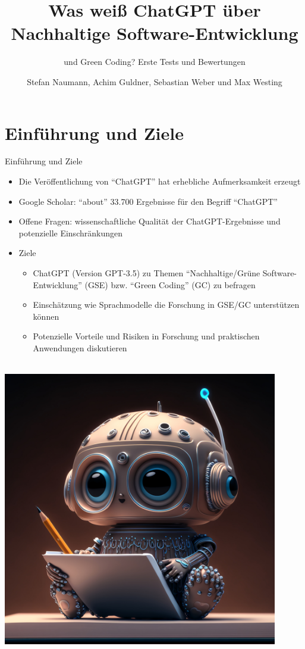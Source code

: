 \documentclass[10pt,aspectratio=169]{beamer}
\title{\Large Was weiß ChatGPT über Nachhaltige Software-Entwicklung}
\subtitle{\Large und Green Coding? Erste Tests und Bewertungen}
\author{\large Stefan Naumann, Achim Guldner, Sebastian Weber und Max Westing}
\institute{\\Hochschule Trier\\Umwelt-Campus Birkenfeld\\Institut für Softwaresysteme}
\begin{document}
\titlepage



\section{Einführung und Ziele}
\begin{frame}{Einführung und Ziele}
    \begin{minipage}{0.65\linewidth}
    \begin{itemize}
        \item Die Veröffentlichung von ``ChatGPT'' hat erhebliche Aufmerksamkeit erzeugt
        \item Google Scholar: ``about'' 33.700 Ergebnisse für den Begriff ``ChatGPT''
        \item Offene Fragen: wissenschaftliche Qualität der ChatGPT-Ergebnisse und potenzielle Einschränkungen
        \item Ziele
        \begin{itemize}
            \item ChatGPT (Version GPT-3.5) zu Themen ``Nachhaltige/Grüne Software-Entwicklung'' (GSE) bzw. ``Green Coding'' (GC) zu befragen
            \item Einschätzung wie Sprachmodelle die Forschung in GSE/GC unterstützen können
            \item Potenzielle Vorteile und Risiken in Forschung und praktischen Anwendungen diskutieren
        \end{itemize}
    \end{itemize}
    \end{minipage}
    \begin{minipage}{0.34\linewidth}
        ~~~~~~~~\includegraphics[width=0.9\textwidth]{assets/AdobeStock_562926073_sm.jpeg}


\end{minipage}
\end{frame}
\end{document}
